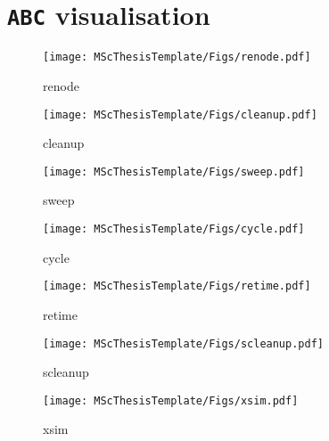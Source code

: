 \renewcommand{\baselinestretch}{1.5}
\chapter{\texttt{ABC} visualisation}
\label{App:abc}
\begin{figure}[htbp]
    \centering
    \texttt{[image: MScThesisTemplate/Figs/renode.pdf]}
    \caption{\footnotesize renode}
\end{figure}
\begin{figure}[htbp]
    \centering
    \texttt{[image: MScThesisTemplate/Figs/cleanup.pdf]}
    \caption{\footnotesize cleanup}
\end{figure}
\begin{figure}[htbp]
    \centering
    \texttt{[image: MScThesisTemplate/Figs/sweep.pdf]}
    \caption{\footnotesize sweep}
\end{figure}
\begin{figure}[htbp]
    \centering
    \texttt{[image: MScThesisTemplate/Figs/cycle.pdf]}
    \caption{\footnotesize cycle}
\end{figure}
\begin{figure}[htbp]
    \centering
    \texttt{[image: MScThesisTemplate/Figs/retime.pdf]}
    \caption{\footnotesize retime}
\end{figure}
\begin{figure}[htbp]
    \centering
    \texttt{[image: MScThesisTemplate/Figs/scleanup.pdf]}
    \caption{\footnotesize scleanup}
\end{figure}
\begin{figure}[htbp]
    \centering
    \texttt{[image: MScThesisTemplate/Figs/xsim.pdf]}
    \caption{\footnotesize xsim}
\end{figure}